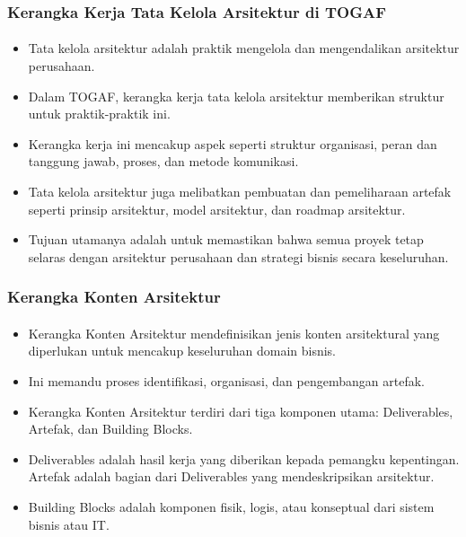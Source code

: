 \documentclass[aspectratio=169, table]{beamer}
\begin{document}
	\begin{frame}
		\frametitle{Kerangka Kerja Tata Kelola Arsitektur di TOGAF}
		\framesubtitle{\hspace{1cm}}
		\begin{itemize}
			\item Tata kelola arsitektur adalah praktik mengelola dan mengendalikan arsitektur perusahaan.
			\item Dalam TOGAF, kerangka kerja tata kelola arsitektur memberikan struktur untuk praktik-praktik ini.
			\item Kerangka kerja ini mencakup aspek seperti struktur organisasi, peran dan tanggung jawab, proses, dan metode komunikasi.
			\item Tata kelola arsitektur juga melibatkan pembuatan dan pemeliharaan artefak seperti prinsip arsitektur, model arsitektur, dan roadmap arsitektur.
			\item Tujuan utamanya adalah untuk memastikan bahwa semua proyek tetap selaras dengan arsitektur perusahaan dan strategi bisnis secara keseluruhan.
		\end{itemize}
	\end{frame}
	
	\begin{frame}
		\frametitle{Kerangka Konten Arsitektur}
		\framesubtitle{\hspace{1cm}}
		\begin{itemize}
			\item Kerangka Konten Arsitektur mendefinisikan jenis konten arsitektural yang diperlukan untuk mencakup keseluruhan domain bisnis.
			\item Ini memandu proses identifikasi, organisasi, dan pengembangan artefak.
			\item Kerangka Konten Arsitektur terdiri dari tiga komponen utama: Deliverables, Artefak, dan Building Blocks.
			\item Deliverables adalah hasil kerja yang diberikan kepada pemangku kepentingan. Artefak adalah bagian dari Deliverables yang mendeskripsikan arsitektur.
			\item Building Blocks adalah komponen fisik, logis, atau konseptual dari sistem bisnis atau IT.
		\end{itemize}
	\end{frame}
	
	
	
\end{document}
